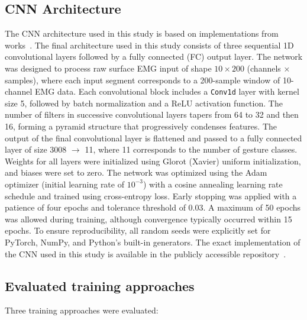 \subsection*{CNN Architecture}
The CNN architecture used in this study is based on implementations from works~\cite{Cote2019_3DC,LibEMG2023}. 
The final architecture used in this study consists of three sequential 1D convolutional layers followed by a fully connected (FC) output layer. The network was designed to process raw surface EMG input of shape $10 \times 200$ (channels × samples), where each input segment corresponds to a 200-sample window of 10-channel EMG data.
Each convolutional block includes a \texttt{Conv1d} layer with kernel size 5, followed by batch normalization and a ReLU activation function. The number of filters in successive convolutional layers tapers from 64 to 32 and then 16, forming a pyramid structure that progressively condenses features. The output of the final convolutional layer is flattened and passed to a fully connected layer of size 3008 $\rightarrow$ 11, where 11 corresponds to the number of gesture classes.
Weights for all layers were initialized using Glorot (Xavier) uniform initialization, and biases were set to zero. The network was optimized using the Adam optimizer (initial learning rate of $10^{-3}$) with a cosine annealing learning rate schedule and trained using cross-entropy loss. Early stopping was applied with a patience of four epochs and tolerance threshold of 0.03. A maximum of 50 epochs was allowed during training, although convergence typically occurred within 15 epochs. To ensure reproducibility, all random seeds were explicitly set for PyTorch, NumPy, and Python’s built-in generators.
The exact implementation of the CNN used in this study is available in the publicly accessible repository~\cite{Kolomiiets2025}.

\subsection*{Evaluated training approaches}

Three training approaches were evaluated:

